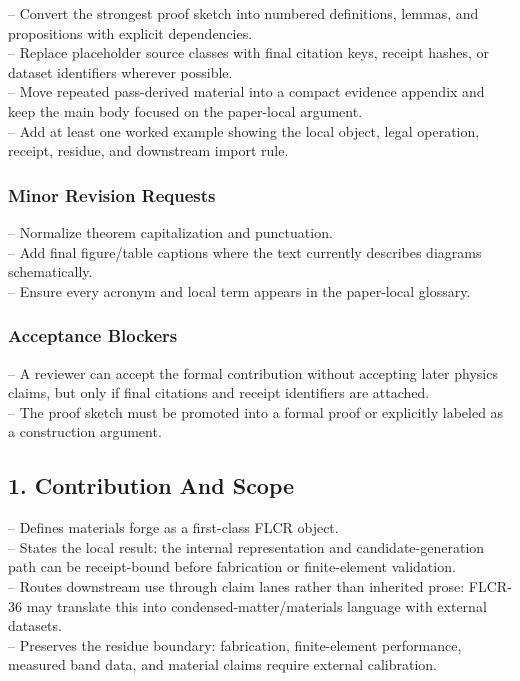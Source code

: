 \documentclass[11pt]{article}
\begin{document}
\noindent{}-- Convert the strongest proof sketch into numbered definitions, lemmas, and propositions with explicit dependencies.\\
\noindent{}-- Replace placeholder source classes with final citation keys, receipt hashes, or dataset identifiers wherever possible.\\
\noindent{}-- Move repeated pass-derived material into a compact evidence appendix and keep the main body focused on the paper-local argument.\\
\noindent{}-- Add at least one worked example showing the local object, legal operation, receipt, residue, and downstream import rule.\\

\subsubsection*{Minor Revision Requests}

\noindent{}-- Normalize theorem capitalization and punctuation.\\
\noindent{}-- Add final figure/table captions where the text currently describes diagrams schematically.\\
\noindent{}-- Ensure every acronym and local term appears in the paper-local glossary.\\

\subsubsection*{Acceptance Blockers}

\noindent{}-- A reviewer can accept the formal contribution without accepting later physics claims, but only if final citations and receipt identifiers are attached.\\
\noindent{}-- The proof sketch must be promoted into a formal proof or explicitly labeled as a construction argument.\\


\subsection*{1. Contribution And Scope}

\noindent{}-- Defines materials forge as a first-class FLCR object.\\
\noindent{}-- States the local result: the internal representation and candidate-generation path can be receipt-bound before fabrication or finite-element validation.\\
\noindent{}-- Routes downstream use through claim lanes rather than inherited prose: FLCR-36 may translate this into condensed-matter/materials language with external datasets.\\
\noindent{}-- Preserves the residue boundary: fabrication, finite-element performance, measured band data, and material claims require external calibration.\\
\end{document}
